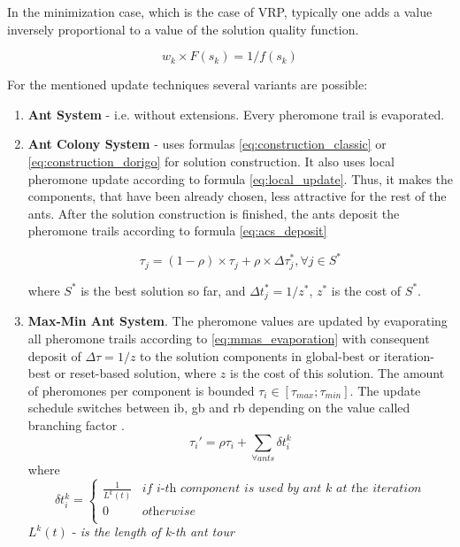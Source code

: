 \documentclass[11pt,a4paper,oneside]{book}
\begin{document}
In the minimization case, which is the case of VRP, typically one adds a value inversely proportional to a value of the solution quality function.

\begin{equation}
w_k \times F(s_k) = 1 / f(s_k)
\end{equation}

For the mentioned update techniques several variants are possible: \\

\begin{enumerate}
\item {\textbf{Ant System} - i.e. without extensions. Every pheromone trail is evaporated.}

\item {\textbf{Ant Colony System} - uses formulas \ref{eq:construction_classic} or \ref{eq:construction_dorigo} for solution construction. It also uses local pheromone update according to formula \ref{eq:local_update}. Thus, it makes the components, that have been already chosen, less attractive for the rest of the ants. After the solution construction is finished, the ants deposit the pheromone trails according to formula \ref{eq:acs_deposit}}

\begin{equation}
\tau_j = (1 - \rho) \times \tau_j + \rho \times \Delta \tau_j^*, \forall j \in S^*
\label{eq:acs_deposit}
\end{equation}

where $S^*$ is the best solution so far, and $\Delta t_j^* = 1/z^*$, $z^*$ is the cost of $S^*$.

\item \textbf{Max-Min Ant System}. The pheromone values are updated by evaporating all pheromone trails according to \ref{eq:mmas_evaporation} with consequent deposit of $\Delta \tau = 1 / z$ to the solution components in global-best or iteration-best or reset-based solution, where $z$ is the cost of this solution. The amount of pheromones per component is bounded $\tau_i \in [\tau_{max};\tau_{min}]$. The update schedule switches between ib, gb and rb depending on the value called branching factor \cite{STUTZLE2000889}.
\begin{equation}
\tau_i' = \rho \tau_i + \sum \limits_{\forall ants} \delta t_i^k
\end{equation}
where
\[
\delta t_i^k =
\left\{
\begin{array}{ll}
      \frac{1}{L^k(t)} & \textit{if i-th component is used by ant k at the iteration}\\
      0 & \textit{otherwise} \\
\end{array} 
\right. 
\]
$L^k(t)$ - \textit{is the length of k-th ant tour}



\end{enumerate}
\end{document}

